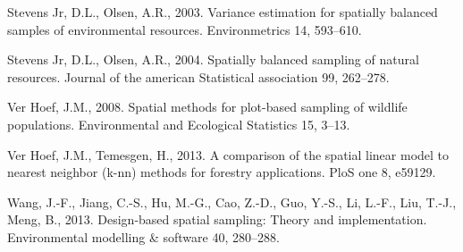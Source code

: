 \documentclass[]{elsarticle} %
\begin{document}
\leavevmode\hypertarget{ref-stevens2003variance}{}%
Stevens Jr, D.L., Olsen, A.R., 2003. Variance estimation for spatially
balanced samples of environmental resources. Environmetrics 14,
593--610.

\leavevmode\hypertarget{ref-stevens2004spatially}{}%
Stevens Jr, D.L., Olsen, A.R., 2004. Spatially balanced sampling of
natural resources. Journal of the american Statistical association 99,
262--278.

\leavevmode\hypertarget{ref-verhoef2008spatial}{}%
Ver Hoef, J.M., 2008. Spatial methods for plot-based sampling of
wildlife populations. Environmental and Ecological Statistics 15, 3--13.

\leavevmode\hypertarget{ref-ver2013comparison}{}%
Ver Hoef, J.M., Temesgen, H., 2013. A comparison of the spatial linear
model to nearest neighbor (k-nn) methods for forestry applications. PloS
one 8, e59129.

\leavevmode\hypertarget{ref-wang2013design}{}%
Wang, J.-F., Jiang, C.-S., Hu, M.-G., Cao, Z.-D., Guo, Y.-S., Li, L.-F.,
Liu, T.-J., Meng, B., 2013. Design-based spatial sampling: Theory and
implementation. Environmental modelling \& software 40, 280--288.
\end{document}
